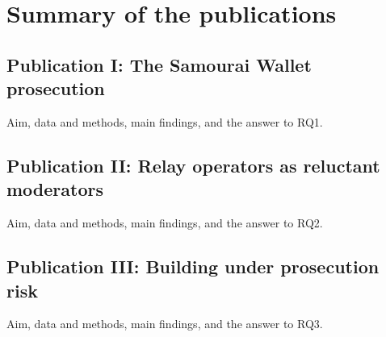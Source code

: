 \chapter{Summary of the publications}\label{ch:publications}

\section{Publication I: The Samourai Wallet prosecution}

Aim, data and methods, main findings, and the answer to RQ1.

\section{Publication II: Relay operators as reluctant moderators}

Aim, data and methods, main findings, and the answer to RQ2.

\section{Publication III: Building under prosecution risk}

Aim, data and methods, main findings, and the answer to RQ3.
